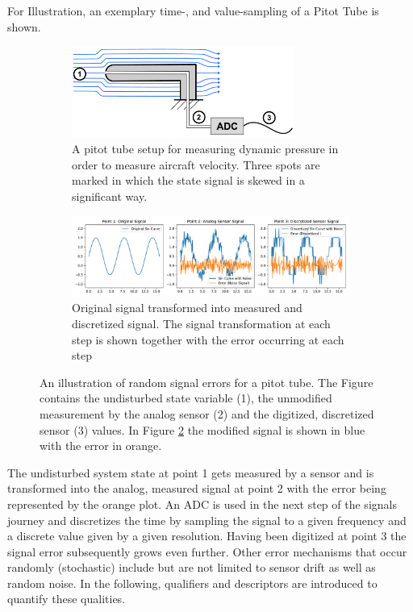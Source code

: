 For Illustration, an exemplary time-, and value-sampling of a Pitot Tube is shown.
\begin{figure}[!h]
    \centering
    \begin{subfigure}{\textwidth}
        \centering
        \includegraphics[width=0.8\textwidth]{03_figures/signal_recording}
        \caption[Exemplary pitot tube for visualizing sensor error]{A pitot tube setup for measuring dynamic pressure in order to measure aircraft velocity. Three spots are marked in which the state signal is skewed in a significant way.}
        \label{fig:signal_processing_setup}
    \end{subfigure}
    \begin{subfigure}{\textwidth}
        \centering
        \includegraphics[width=\textwidth]{03_figures/python_functions/images/signal_processing_plots}
        \caption[Pitot Tube signal visualization with inherent errors]{Original signal transformed into measured and discretized signal. The signal transformation at each step is shown together with the error occurring at each step}
        \label{fig:signal_processing_plots}
    \end{subfigure}
    \caption[Exemplary signal processing flow for a pitot tube]{An illustration of random signal errors for a pitot tube. The Figure contains the undisturbed state variable (1), the unmodified measurement by the analog sensor (2) and the digitized, discretized sensor (3) values. In Figure \ref{fig:signal_processing_plots} the modified signal is shown in blue with the error in orange.}
    \label{fig:signal_processing}
\end{figure}

The undisturbed system state at point 1 gets measured by a sensor and is transformed into the analog, measured signal at point 2 with the error being represented by the orange plot. An ADC is used in the next step of the signals journey and discretizes the time by sampling the signal to a given frequency and a discrete value given by a given resolution. Having been digitized at point 3 the signal error subsequently grows even further. Other error mechanisms that occur randomly (stochastic) include but are not limited to sensor drift as well as random noise. In the following, qualifiers and descriptors are introduced to quantify these qualities.




